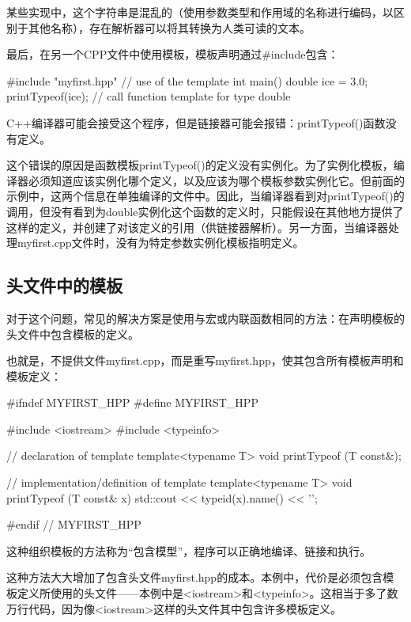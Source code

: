 \begin{notice}
某些实现中，这个字符串是混乱的（使用参数类型和作用域的名称进行编码，以区别于其他名称），存在解析器可以将其转换为人类可读的文本。
\end{notice}

最后，在另一个CPP文件中使用模板，模板声明通过\#include包含：

\begin{cpp}
#include "myfirst.hpp"
// use of the template
int main() {
	double ice = 3.0;
	printTypeof(ice); // call function template for type double
}
\end{cpp}

C++编译器可能会接受这个程序，但是链接器可能会报错：printTypeof()函数没有定义。

这个错误的原因是函数模板printTypeof()的定义没有实例化。为了实例化模板，编译器必须知道应该实例化哪个定义，以及应该为哪个模板参数实例化它。但前面的示例中，这两个信息在单独编译的文件中。因此，当编译器看到对printTypeof()的调用，但没有看到为double实例化这个函数的定义时，只能假设在其他地方提供了这样的定义，并创建了对该定义的引用（供链接器解析）。另一方面，当编译器处理myfirst.cpp文件时，没有为特定参数实例化模板指明定义。

\subsection{头文件中的模板}

对于这个问题，常见的解决方案是使用与宏或内联函数相同的方法：在声明模板的头文件中包含模板的定义。

也就是，不提供文件myfirst.cpp，而是重写myfirst.hpp，使其包含所有模板声明和模板定义：

\begin{cpp}
#ifndef MYFIRST_HPP
#define MYFIRST_HPP

#include <iostream>
#include <typeinfo>

// declaration of template
template<typename T>
void printTypeof (T const&);

// implementation/definition of template
template<typename T>
void printTypeof (T const& x) {
	std::cout << typeid(x).name() << '\n';
}

#endif // MYFIRST_HPP
\end{cpp}

这种组织模板的方法称为“包含模型”，程序可以正确地编译、链接和执行。

这种方法大大增加了包含头文件myfirst.hpp的成本。本例中，代价是必须包含模板定义所使用的头文件——本例中是<iostream>和<typeinfo>。这相当于多了数万行代码，因为像<iostream>这样的头文件其中包含许多模板定义。

